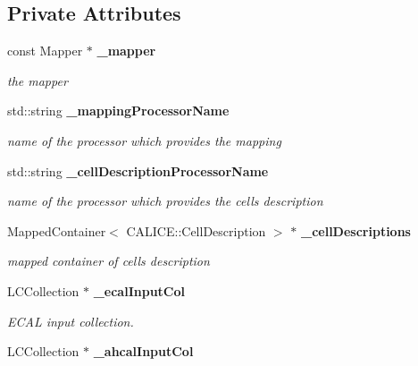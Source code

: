 \subsection*{Private Attributes}
\begin{DoxyCompactItemize}
\item 
const Mapper $\ast$ {\bf \_\-mapper}\label{classCALICE_1_1MipTrackFinder_af8ea6a3ae97f2df24592e914ff613203}

\begin{DoxyCompactList}\small\item\em the mapper \item\end{DoxyCompactList}\item 
std::string {\bf \_\-mappingProcessorName}\label{classCALICE_1_1MipTrackFinder_a19a0560f8d46d6669b10f253f21f6e7a}

\begin{DoxyCompactList}\small\item\em name of the processor which provides the mapping \item\end{DoxyCompactList}\item 
std::string {\bf \_\-cellDescriptionProcessorName}\label{classCALICE_1_1MipTrackFinder_a6df4ecb6db21429aefd2900cdc1e4fb7}

\begin{DoxyCompactList}\small\item\em name of the processor which provides the cells description \item\end{DoxyCompactList}\item 
MappedContainer$<$ CALICE::CellDescription $>$ $\ast$ {\bf \_\-cellDescriptions}\label{classCALICE_1_1MipTrackFinder_aefbda6dfe51dc6bcfc5c1e33da66f9cc}

\begin{DoxyCompactList}\small\item\em mapped container of cells description \item\end{DoxyCompactList}\item 
LCCollection $\ast$ {\bf \_\-ecalInputCol}\label{classCALICE_1_1MipTrackFinder_aad63fbdc5a30192ec5cf167513b9ad42}

\begin{DoxyCompactList}\small\item\em ECAL input collection. \item\end{DoxyCompactList}\item 
LCCollection $\ast$ {\bf \_\-ahcalInputCol}\label{classCALICE_1_1MipTrackFinder_a0d088912057e75d9f714e10618e45a64}


\end{DoxyCompactItemize}
